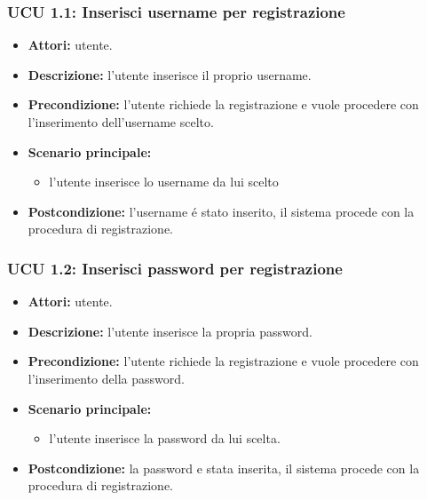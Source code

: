 \subsubsection{UCU 1.1: Inserisci username per registrazione}
\begin{itemize}
	\item \textbf{Attori:} utente.
	\item \textbf{Descrizione: } l'utente inserisce il proprio username.
	\item \textbf{Precondizione:} l'utente richiede la registrazione e vuole procedere con 				l'inserimento dell'username scelto.
	\item \textbf{Scenario principale:}
	\begin{itemize}
		\item l'utente inserisce lo username da lui scelto
	\end{itemize}
	\item \textbf{Postcondizione:}  l'username é stato inserito, il sistema procede con la 			procedura di registrazione.
\end{itemize}

\subsubsection{UCU 1.2: Inserisci password per registrazione}
\begin{itemize}
	\item \textbf{Attori: } utente.
	\item \textbf{Descrizione: } l'utente inserisce la propria password.
	\item \textbf{Precondizione: } l'utente richiede la registrazione e vuole procedere con 				l'inserimento della password.
	\item \textbf{Scenario principale:}
	\begin{itemize}
		\item l'utente inserisce la password da lui scelta.
	\end{itemize}
	\item \textbf{Postcondizione: }la password e stata inserita, il sistema procede con la 			procedura di registrazione.
\end{itemize}

